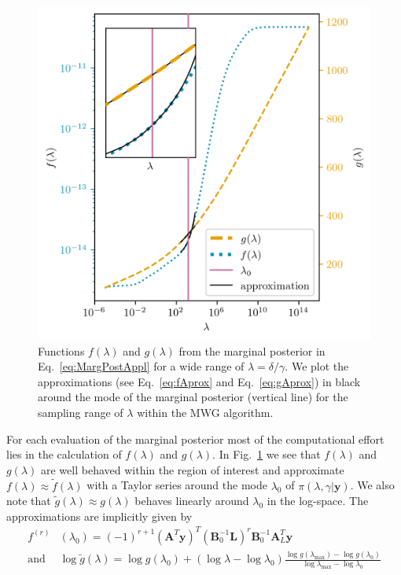 \begin{figure}[th!]
	\centering
	\includegraphics{f_and_g_phd.png}
	\caption[Functions $f(\lambda)$ and $g(\lambda)$ of 2D marginal posterior.]{Functions $f(\lambda)$ and $g(\lambda)$ from the marginal posterior in Eq.~\ref{eq:MargPostAppl} for a wide range of $\lambda = \delta / \gamma$. We plot the approximations (see Eq.~\ref{eq:fAprox} and Eq.~\ref{eq:gAprox}) in black around the mode of the marginal posterior (vertical line) for the sampling range of $\lambda$ within the MWG algorithm.}
	\label{fig:fandg}
\end{figure}
For each evaluation of the marginal posterior most of the computational effort lies in the calculation of $f(\lambda)$ and $g(\lambda)$.
In  Fig.~\ref{fig:fandg} we see that $f(\lambda)$ and $g(\lambda)$ are well behaved within the region of interest and approximate $f(\lambda) \approx \tilde{f}(\lambda)$ with a Taylor series around the mode $\lambda_0$ of $\pi(\lambda, \gamma | \bm{y})$.
We also note that $\tilde{g}(\lambda) \approx g(\lambda)$ behaves linearly around $\lambda_0$ in the log-space.
The approximations are implicitly given by
\begin{align}
	f^{(r)}& (\lambda_0)= (-1)^{r+1} (\bm{A}^T \bm{y})^T (\bm{B}_0^{-1} \bm{L})^r \bm{B}_0^{-1} \bm{A}_L^T \bm{y} \label{eq:ftay}  \\
	\text{and } & \log{ \tilde{g}(\lambda)} = \log{ g(\lambda_{0})} + (\log{\lambda} - \log{\lambda_{0}})  \frac{ \log{g(\lambda_{\text{max}})} - \log{g(\lambda_{0})} }{\log{\lambda_{\text{max}}} - \log{\lambda_{0}} } 
	\label{eq:gtay}
\end{align} 
